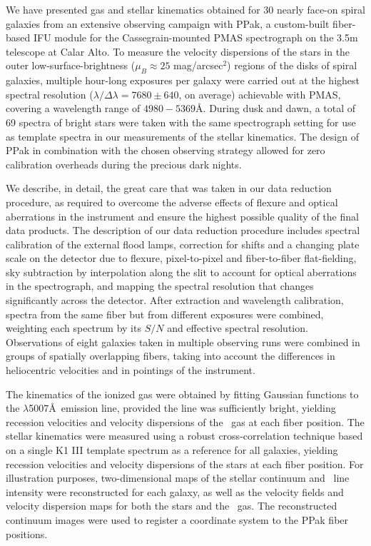\documentclass[traditabstract]{aa} %
\begin{document}
We have presented gas and stellar kinematics obtained for 30 nearly face-on spiral
galaxies from an extensive observing campaign with PPak, a custom-built fiber-based IFU
module for the Cassegrain-mounted PMAS spectrograph on the 3.5m telescope at Calar Alto.
To measure the velocity dispersions of the stars in the outer low-surface-brightness
($\mu_B\approx25$ mag/arcsec$^2$) regions of the disks of spiral galaxies, multiple 
hour-long exposures per galaxy were carried out at the highest spectral resolution
($\lambda/\Delta\lambda=7680\pm640$, on average) achievable with PMAS, covering a
wavelength range of $4980-5369$\AA. During dusk and dawn, a total of 69 spectra of bright
stars were taken with the same spectrograph setting for use as template spectra in our
measurements of the stellar kinematics. The design of PPak in combination with the chosen
observing strategy allowed for zero calibration overheads during the precious dark nights.

We describe, in detail, the great care that was taken in our data reduction
procedure, as required to overcome the adverse effects of flexure and optical
aberrations in the instrument and ensure the highest possible quality of the
final data products.  The description of our data reduction procedure includes
spectral calibration of the external flood lamps, correction for shifts and a
changing plate scale on the detector due to flexure, pixel-to-pixel and
fiber-to-fiber flat-fielding, sky subtraction by interpolation along the slit to
account for optical aberrations in the spectrograph, and mapping the spectral
resolution that changes significantly across the detector.  After extraction and
wavelength calibration, spectra from the same fiber but from different exposures
were combined, weighting each spectrum by its $S/N$ and effective spectral
resolution. Observations of eight galaxies taken in multiple observing runs were
combined in groups of spatially overlapping fibers, taking into account the
differences in heliocentric velocities and in pointings of the instrument.

The kinematics of the ionized gas were obtained by fitting Gaussian functions to
the \oiii$\lambda$5007\AA\ emission line, provided the line was sufficiently
bright, yielding recession velocities and velocity dispersions of the \oiii\ gas
at each fiber position.  The stellar kinematics were measured using a robust
cross-correlation technique  based on a
single K1 III template spectrum as a reference for all galaxies, yielding
recession velocities and velocity dispersions of the stars at each fiber
position.  For illustration purposes, two-dimensional maps of the stellar
continuum and \oiii\ line intensity were reconstructed for each galaxy, as well
as the velocity fields and velocity dispersion maps for both the stars and the
\oiii\ gas. The reconstructed continuum images were used to register a
coordinate system to the PPak fiber positions.
\end{document}
